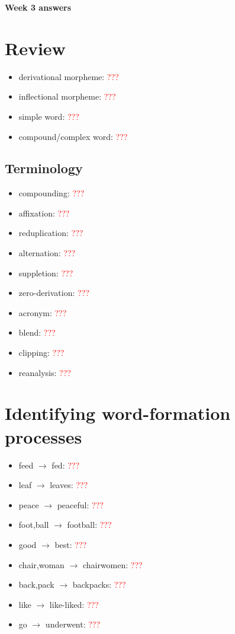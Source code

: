 \documentclass[a4paper,11pt]{article}
\begin{document}
\begin{center}
\Large{\textbf{Week 3 answers}}
\end{center}


\section{Review}

\begin{itemize}
\item derivational morpheme: \textcolor{red}{???}
\item inflectional morpheme: \textcolor{red}{???}
\item simple word: \textcolor{red}{???}
\item compound/complex word: \textcolor{red}{???}
\end{itemize}


\subsection{Terminology}

\begin{itemize}
\item compounding: \textcolor{red}{???}
\item affixation: \textcolor{red}{???}
\item reduplication: \textcolor{red}{???}
\item alternation: \textcolor{red}{???}
\item suppletion: \textcolor{red}{???}
\item zero-derivation: \textcolor{red}{???}
\item acronym: \textcolor{red}{???}
\item blend: \textcolor{red}{???}
\item clipping: \textcolor{red}{???}
\item reanalysis: \textcolor{red}{???}
\end{itemize}


\section{Identifying word-formation processes}

\begin{itemize}
\item feed $\rightarrow$ fed: \textcolor{red}{???}
\item leaf $\rightarrow$ leaves: \textcolor{red}{???}
\item peace $\rightarrow$ peaceful: \textcolor{red}{???}
\item foot,ball $\rightarrow$ football: \textcolor{red}{???}
\item good $\rightarrow$ best: \textcolor{red}{???}
\item chair,woman $\rightarrow$ chairwomen: \textcolor{red}{???}
\item back,pack $\rightarrow$ backpacks: \textcolor{red}{???}
\item like $\rightarrow$ like-liked: \textcolor{red}{???}
\item go $\rightarrow$ underwent: \textcolor{red}{???}
\end{itemize}
\end{document}
